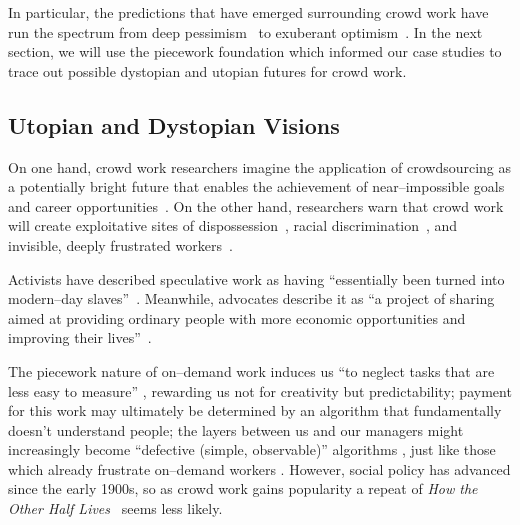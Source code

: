 \documentclass[trackingWork]{subfiles}
\begin{document}
In particular, the predictions that have emerged surrounding crowd work have run the spectrum
from deep pessimism~\cite{fort2011amazon} to exuberant optimism~\cite{crowdworkFuture}.
In the next section, we will use
the piecework foundation which informed our case studies
to trace out possible dystopian and utopian futures for crowd work.


\subsection{Utopian and Dystopian Visions}\label{sec:polarizationOfCrowdWork}
On one hand, crowd work researchers
imagine the application of crowdsourcing as
a potentially bright future that enables the achievement of near--impossible goals and career opportunities~\cite{redballoon,crowdworkFuture,vizwiz,suzukiAtelier}. %
On the other hand, researchers
warn that crowd work will create exploitative sites of dispossession~\cite{scholz2012digital},
racial discrimination~\cite{edelman2015racial},
and invisible, deeply frustrated workers~\cite{turkopticon,bighamHalfWorkday}.

Activists have described speculative work as having
``essentially been turned into modern--day slaves''~\cite{activistsHuffPoLawsuit}.
Meanwhile, advocates describe it as
``a project of sharing
aimed at providing ordinary people
with more economic opportunities and
improving their lives''~\cite{uberPropaganda}.

The piecework nature of on--demand work induces us
``to neglect tasks that are less easy to measure'' \cite{SJOE:SJOE371},
rewarding us not for creativity but predictability;
payment for this work may ultimately be determined by
an algorithm that fundamentally doesn't understand people;
the layers between us and our managers might increasingly become
``defective (simple, observable)'' algorithms \cite{10.2307/2555446},
just like those which already frustrate
on--demand workers
\cite{uberAlgorithm,dynamo,turkopticon}.
However, social policy has advanced since the early 1900s, so as crowd work gains popularity a repeat of \textit{How the Other Half Lives}~\cite{riisOtherSideLives} seems less likely.
\end{document}
